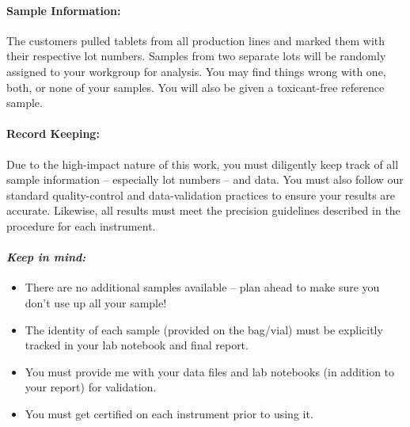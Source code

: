 \documentclass[]{tufte-book}
\providecommand{\tightlist}{%
  \setlength{\itemsep}{0pt}\setlength{\parskip}{0pt}}
\begin{document}
\hypertarget{sample-information}{%
\paragraph{\texorpdfstring{\textbf{Sample Information:}}{Sample Information:}}\label{sample-information}}

The customers pulled tablets from all production lines and marked them with their respective lot numbers. Samples from two separate lots will be randomly assigned to your workgroup for analysis. You may find things wrong with one, both, or none of your samples. You will also be given a toxicant-free reference sample.

\hypertarget{record-keeping}{%
\paragraph{\texorpdfstring{\textbf{Record Keeping:}}{Record Keeping:}}\label{record-keeping}}

Due to the high-impact nature of this work, you must diligently keep track of all sample information -- especially lot numbers -- and data. You must also follow our standard quality-control and data-validation practices to ensure your results are accurate. Likewise, all results must meet the precision guidelines described in the procedure for each instrument.

\hypertarget{keep-in-mind}{%
\paragraph{\texorpdfstring{\emph{Keep in mind:}}{Keep in mind:}}\label{keep-in-mind}}

\begin{itemize}
\tightlist
\item
  There are no additional samples available -- plan ahead to make sure you don't use up all your sample!\\
\item
  The identity of each sample (provided on the bag/vial) must be explicitly tracked in your lab notebook and final report.\\
\item
  You must provide me with your data files and lab notebooks (in addition to your report) for validation.\\
\item
  You must get certified on each instrument prior to using it.
\end{itemize}
\end{document}
